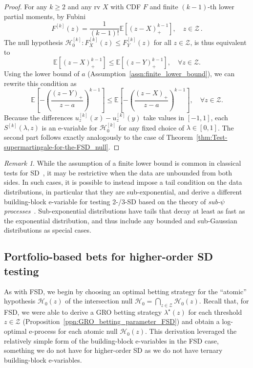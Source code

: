 \documentclass[12pt,twoside]{article}
\theoremstyle{plain}
\theoremstyle{definition}
\theoremstyle{remark}
\newtheorem{remark}{Remark}
\newcommand{\inparen}[1]{\left(#1\right)}
\newcommand{\calH}{\mathcal{H}}
\newcommand{\calZ}{\mathcal{Z}}
\newcommand{\Esymb}{\mathbb{E}}
\newcommand{\ex}[1]{\Esymb\left[{#1}\right]}
\begin{document}
\begin{proof}
    For any $k \geq 2$ and any rv $X$ with CDF $F$ and finite $(k-1)$-th lower partial moments, by Fubini
\begin{equation*}\label{eq:equiv_characterization_HO_FSD}
    F^{[k]}(z) = \frac{1}{(k-1)!} \ex{(z-X)_+^{k-1}}, \quad z\in \calZ\,.
\end{equation*}
The null hypothesis $\calH_0^{[k]}: F_X^{[k]}(z) \leq F_Y^{[k]}(z)$ for all $z \in \calZ$, is thus equivalent to
\begin{equation*}
    \ex{(z-X)_+^{k-1}} \leq \ex{(z-Y)_+^{k-1}}, \quad \forall z\in \calZ.
\end{equation*}
Using the lower bound of $a$ (Assumption~\ref{assn:finite_lower_bound}), we can rewrite this condition as
\begin{equation*}
\ex{-\inparen{\frac{(z-Y)_+}{z-a}}^{k-1}} \leq \ex{-\inparen{\frac{(z-X)_+}{z-a}}^{k-1}}, \quad \forall z\in \calZ.
\end{equation*}
Because the differences $u_z^{[k]}(x) - u_z^{[k]}(y)$ take values in $[-1, 1]$, each $S^{[k]}(\lambda, z)$ is an e-variable for $\calH_0^{[k]}$ for any fixed choice of $\lambda \in [0, 1]$. 
The second part follows exactly analogously to the case of Theorem~\ref{thm:Test-supermartingale-for-the-FSD_null}. 
\end{proof}



\begin{remark}
While the assumption of a finite lower bound is common in classical tests for SD~\citep[e.g.,][]{barrett2003consistent,linton2005consistent}, it may be restrictive when the data are unbounded from both sides.  
In such cases, it is possible to instead impose a tail condition on the data distributions, in particular that they are sub-exponential, and derive a different building-block e-variable for testing 2-/3-SD based on the theory of \emph{sub-$\psi$ processes}~\citep{howard2020chernoff,howard2021time}. 
Sub-exponential distributions have tails that decay at least as fast as the exponential distribution, and thus include any bounded and sub-Gaussian distributions as special cases. 
\end{remark}


\subsection{Portfolio-based bets for higher-order SD testing}\label{sec:ksd_portfolio}

As with FSD, we begin by choosing an optimal betting strategy for the ``atomic'' hypothesis $\calH_0(z)$ of the intersection null $\calH_0 = \bigcap_{z \in \calZ} \calH_0(z)$. 
Recall that, for FSD, we were able to derive a GRO betting strategy $\lambda^\star(z)$ for each threshold $z \in \calZ$ (Proposition~\ref{ppn:GRO_betting_parameter_FSD}) and obtain a log-optimal e-process for each atomic null $\calH_0(z)$. 
This derivation leveraged the relatively simple form of the building-block e-variables in the FSD case, something we do not have for higher-order SD as we do not have ternary building-block e-variables. 
\end{document}
